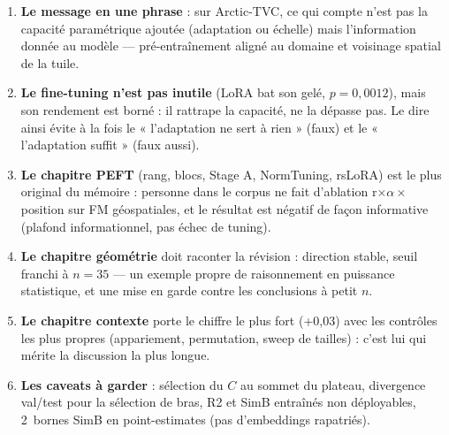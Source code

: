 \documentclass[10pt,a4paper]{article}
\begin{document}
\begin{enumerate}
\item \textbf{Le message en une phrase} : sur Arctic-TVC, ce qui compte n'est pas
la capacité paramétrique ajoutée (adaptation ou échelle) mais l'information donnée
au modèle — pré-entraînement aligné au domaine et voisinage spatial de la tuile.
\item \textbf{Le fine-tuning n'est pas inutile} (LoRA bat son gelé, $p=0{,}0012$),
mais son rendement est borné : il rattrape la capacité, ne la dépasse pas. Le
dire ainsi évite à la fois le « l'adaptation ne sert à rien » (faux) et le
« l'adaptation suffit » (faux aussi).
\item \textbf{Le chapitre PEFT} (rang, blocs, Stage A, NormTuning, rsLoRA) est le
plus original du mémoire : personne dans le corpus ne fait d'ablation
r$\times\alpha\times$position sur FM géospatiales, et le résultat est négatif de
façon informative (plafond informationnel, pas échec de tuning).
\item \textbf{Le chapitre géométrie} doit raconter la révision : direction stable,
seuil franchi à $n=35$ — un exemple propre de raisonnement en puissance
statistique, et une mise en garde contre les conclusions à petit $n$.
\item \textbf{Le chapitre contexte} porte le chiffre le plus fort (+0,03) avec les
contrôles les plus propres (appariement, permutation, sweep de tailles) : c'est
lui qui mérite la discussion la plus longue.
\item \textbf{Les caveats à garder} : sélection du $C$ au sommet du plateau,
divergence val/test pour la sélection de bras, R2 et SimB entraînés non
déployables, 2~bornes SimB en point-estimates (pas d'embeddings rapatriés).
\end{enumerate}
\end{document}
